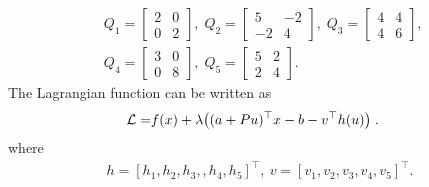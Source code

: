 \documentclass[journal,twoside,web]{ieeecolor}
\begin{document}
\begin{align*}
&Q_1=\left[\begin{array}{ccl} 2 & 0\\0 & 2 \end{array}\right],\; Q_2=\left[\begin{array}{ccl} 5 & -2\\-2 & 4  \end{array}\right],\; Q_3=\left[\begin{array}{ccl} 4 & 4\\4 & 6\end{array}\right],\;\\
&Q_4=\left[\begin{array}{ccl} 3 & 0\\0 & 8 \end{array}\right],\;
Q_5=\left[\begin{array}{ccl} 5 & 2\\2 & 4 \end{array}\right].
\end{align*}
The Lagrangian function can be written as
\begin{align*}
{\cal L}=&f(x)+\lambda \big((a+Pu)^\top x-b-v ^\top h(u)\big)\;.
\end{align*}
where
\begin{align*}
h=[h_1,h_2,h_3,,h_4,h_5]^\top ,\ v=[v_1,v_2,v_3,v_4,v_5]^\top.
\end{align*}
\end{document}
